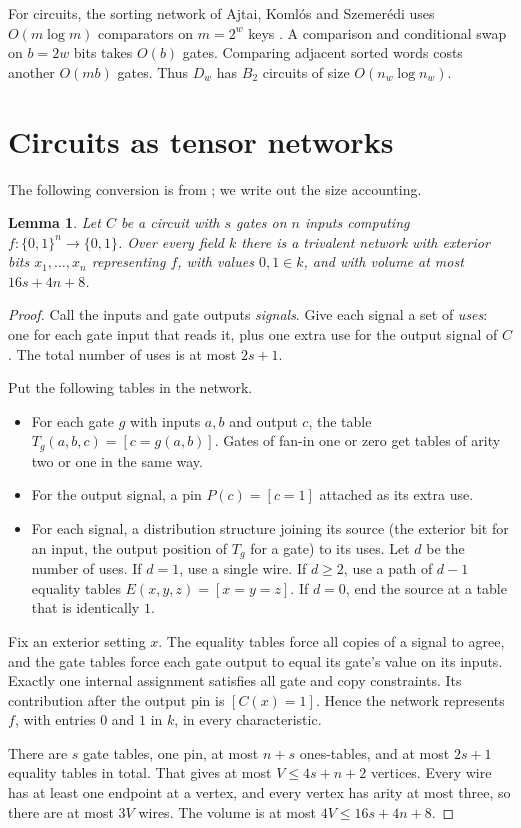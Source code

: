 \documentclass[11pt]{article}
\newtheorem{lemma}[theorem]{Lemma}
\theoremstyle{definition}
\theoremstyle{remark}
\begin{document}
For circuits, the sorting network of Ajtai, Koml\'os and Szemer\'edi
uses $O(m\log m)$ comparators on $m=2^w$ keys \cite{AKS}.
A comparison and conditional swap on $b=2w$ bits takes $O(b)$ gates.
Comparing adjacent sorted words costs another $O(mb)$ gates.
Thus $D_w$ has $B_2$ circuits of size $O(n_w\log n_w)$.

\section{Circuits as tensor networks}
The following conversion is from \cite[proof of Proposition~2.3]{OAI}; we
write out the size accounting.

\begin{lemma}\label{lem:convert}
Let $C$ be a circuit with $s$ gates on $n$ inputs computing
$f:\{0,1\}^n\to\{0,1\}$. Over every field $k$ there is a trivalent network
with exterior bits $x_1,\dots,x_n$ representing $f$, with values $0,1\in k$,
and with volume at most $16s+4n+8$.
\end{lemma}
\begin{proof}
Call the inputs and gate outputs \emph{signals}. Give each signal a set
of \emph{uses}: one for each gate input that reads it, plus one extra use
for the output signal of $C$. The total number of uses is at most
$2s+1$.

Put the following tables in the network.
\begin{itemize}
\item For each gate $g$ with inputs $a,b$ and output $c$, the table
$T_g(a,b,c)=[c=g(a,b)]$. Gates of fan-in one or zero get tables of
arity two or one in the same way.
\item For the output signal, a pin $P(c)=[c=1]$ attached as its extra use.
\item For each signal, a distribution structure joining its source (the
exterior bit for an input, the output position of $T_g$ for a gate) to
its uses. Let $d$ be the number of uses. If $d=1$, use a single wire.
If $d\ge2$, use a path of $d-1$ equality tables
$E(x,y,z)=[x=y=z]$. If $d=0$, end the source at a table that is
identically $1$.
\end{itemize}
Fix an exterior setting $x$. The equality tables force all copies of a
signal to agree, and the gate tables force each gate output to equal its
gate's value on its inputs. Exactly one internal assignment satisfies
all gate and copy constraints. Its contribution after the output pin is
$[C(x)=1]$. Hence the network represents
$f$, with entries $0$ and $1$ in $k$, in every characteristic.

There are $s$ gate tables, one pin, at most $n+s$ ones-tables, and at most
$2s+1$ equality tables in total. That gives at most $V\le 4s+n+2$
vertices. Every wire has at least one endpoint at a vertex, and every
vertex has arity at most three, so there are at most $3V$ wires. The
volume is at most $4V\le 16s+4n+8$.
\end{proof}
\end{document}
